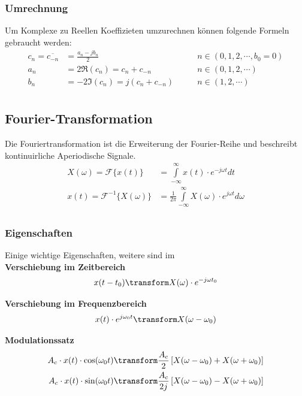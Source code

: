 \subsubsection{Umrechnung}\label{umrechnung}
Um Komplexe zu Reellen Koeffizieten umzurechnen können folgende Formeln gebraucht werden:
\begin{align*}
	c_n = \overline{c_{-n}} &= \frac{a_n - jb_n}{2} &\qquad n \in (0,1,2, \cdots, b_0 = 0) \\
	a_n &= 2\Re(c_n) = c_n + c_{-n}  &\qquad n \in (0,1,2, \cdots) \\
	b_n &= -2\Im(c_n) = j(c_n + c_{-n}) &\qquad n \in (1,2, \cdots) \\
\end{align*}



\subsection{Fourier-Transformation}
Die Fouriertransformation ist die Erweiterung der Fourier-Reihe und beschreibt kontinuirliche Aperiodische Signale.
\begin{align*}
	X(\omega) = \mathcal{F}\{x(t)\} &= \int\limits_{-\infty}^{\infty}x(t)\cdot e^{-j\omega t}dt \\
	x(t) = \mathcal{F}^{-1}\{X(\omega)\} &= \frac{1}{2\pi}\int\limits_{-\infty}^{\infty}X(\omega)\cdot e^{j\omega t}d\omega \\
\end{align*}

\subsubsection{Eigenschaften}
Einige wichtige Eigenschaften, weitere sind im \\
\noindent\textbf{Verschiebung im Zeitbereich}
\begin{align*}
	x(t - t_0) \transform X(\omega) \cdot e^{-j\omega t_0} 
\end{align*}

\noindent\textbf{Verschiebung im Frequenzbereich}
\begin{align*}
	x(t) \cdot e^{j\omega_0 t} \transform X(\omega - \omega_0)
\end{align*}

\noindent\textbf{Modulationssatz}
\begin{align*}
	A_c \cdot x(t) \cdot \cos(\omega_0t) &\transform \frac{A_c}{2}\left[X(\omega - \omega_0) + X(\omega + \omega_0)\right] \\
	A_c \cdot x(t) \cdot \sin(\omega_0t) &\transform \frac{A_c}{2j}\left[X(\omega - \omega_0) - X(\omega + \omega_0)\right]
\end{align*}

